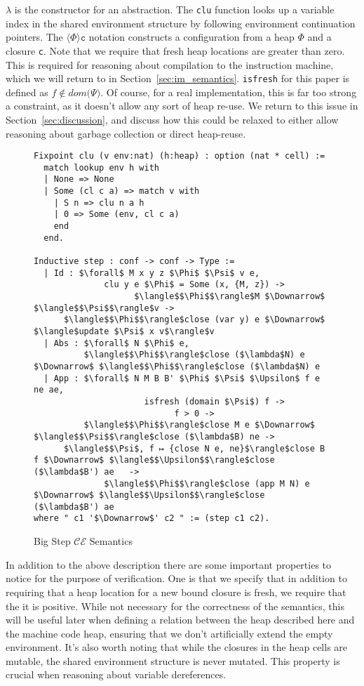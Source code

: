 $\lambda$ is the constructor for an abstraction. The \texttt{clu} function looks
up a variable index in the shared environment structure by following environment
continuation pointers. The $\langle \Phi \rangle \texttt{c}$ notation constructs
a configuration from a heap $\Phi$ and a closure \texttt{c}. Note that we
require that fresh heap locations are greater than zero. This is required for
reasoning about compilation to the instruction machine, which we will return to
in Section~\ref{sec:im_semantics}. \texttt{isfresh} for this paper is defined as $f \notin
dom \big( \Psi \big)$. Of course, for a real implementation, this is far too strong a
constraint, as it doesn't allow any sort of heap re-use. We return to this issue
in Section~\ref{sec:discussion}, and discuss how this could be relaxed to either
allow reasoning about garbage collection or direct heap-reuse.

\begin{figure}
\begin{lstlisting}
Fixpoint clu (v env:nat) (h:heap) : option (nat * cell) := 
  match lookup env h with
  | None => None
  | Some (cl c a) => match v with
    | S n => clu n a h
    | 0 => Some (env, cl c a)
    end
  end.

Inductive step : conf -> conf -> Type :=
  | Id : $\forall$ M x y z $\Phi$ $\Psi$ v e, 
              clu y e $\Phi$ = Some (x, {M, z}) -> 
                    $\langle$$\Phi$$\rangle$M $\Downarrow$ $\langle$$\Psi$$\rangle$v ->
      $\langle$$\Phi$$\rangle$close (var y) e $\Downarrow$ $\langle$update $\Psi$ x v$\rangle$v
  | Abs : $\forall$ N $\Phi$ e, 
          $\langle$$\Phi$$\rangle$close ($\lambda$N) e $\Downarrow$ $\langle$$\Phi$$\rangle$close ($\lambda$N) e
  | App : $\forall$ N M B B' $\Phi$ $\Psi$ $\Upsilon$ f e ne ae, 
                      isfresh (domain $\Psi$) f -> 
                            f > 0 ->
          $\langle$$\Phi$$\rangle$close M e $\Downarrow$ $\langle$$\Psi$$\rangle$close ($\lambda$B) ne -> 
      $\langle$$\Psi$, f ↦ {close N e, ne}$\rangle$close B f $\Downarrow$ $\langle$$\Upsilon$$\rangle$close ($\lambda$B') ae   ->
              $\langle$$\Phi$$\rangle$close (app M N) e $\Downarrow$ $\langle$$\Upsilon$$\rangle$close ($\lambda$B') ae
where " c1 '$\Downarrow$' c2 " := (step c1 c2).
\end{lstlisting}
\caption{Big Step $\mathcal{CE}$ Semantics}
\label{fig:bigstep}
\end{figure}

In addition to the above description there are some important properties to
notice for the purpose of verification. One is that we specify that in addition
to requiring that a heap location for a new bound closure is fresh, we require
that the it is positive. While not necessary for the correctness of the
semantics, this will be useful later when defining a relation between the heap
described here and the machine code heap, ensuring that we don't artificially
extend the empty environment. It's also worth noting that while the closures in
the heap cells are mutable, the shared environment structure is never mutated.
This property is crucial when reasoning about variable dereferences. 

